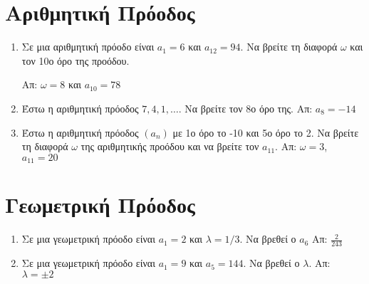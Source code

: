 \documentclass[a4paper]{report}
\begin{document}
\begin{center}
  \minibox{\large\bfseries \textcolor{Col1}{Aσκήσεις στις Ακολουθίες}}
\end{center}

\vspace{\baselineskip}

\section*{Αριθμητική Πρόοδος}

\begin{enumerate}
  \item Σε μια αριθμητική πρόοδο είναι $ a_1=6 $ και $ a_{12}=94 $. 
    Να βρείτε τη διαφορά $ \omega $ και τον 10ο όρο της προόδου.

    \hfill Απ: $ \omega = 8 $ και $ a_{10} = 78$  
  \item Έστω η αριθμητική πρόοδος $ 7,4,1, \ldots $. Να βρείτε τον 
    8ο όρο της.
    \hfill Απ: $ a_{8}=-14 $  

  \item Έστω η αριθμητική πρόοδος $ (a_{n}) $ με 1ο όρο το -10 και 5ο 
    όρο το 2. Να βρείτε τη διαφορά $ \omega $ της αριθμητικής προόδου 
    και να βρείτε τον $ a_{11} $.
    \hfill Απ: $\omega = 3$, $ a_{11}=20 $ 
\end{enumerate}

\section*{Γεωμετρική Πρόοδος}
\begin{enumerate}
  \item Σε μια γεωμετρική πρόοδο είναι $ a_1=2 $ και $ \lambda = 1/3$. 
    Να βρεθεί ο $ a_{6} $ 
    \hfill Απ: $ \frac{2}{243} $ 

  \item Σε μια γεωμετρική πρόοδο είναι $ a_1=9 $ και $a_{5} = 144$. 
    Να βρεθεί ο $ \lambda $. 
    \hfill Απ: $ \lambda = \pm 2 $ 

\end{enumerate}
\end{document}
